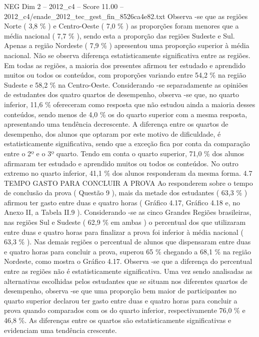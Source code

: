 \begin{textsample}{NEG Dim 2 – 2012\_c4 – Score 11.00 – 2012\_c4/enade\_2012\_tec\_gest\_fin\_8526ca4e82.txt}
Observa -se que as regiões Norte ( 3,8 \% ) e Centro-Oeste ( 7,0 \% ) as proporções foram menores que a média nacional ( 7,7 \% ), sendo esta a proporção das regiões Sudeste e Sul.
Apenas a região Nordeste ( 7,9 \% ) apresentou uma proporção superior à média nacional.
Não se observa diferença estatisticamente significativa entre as regiões.
Em todas as regiões, a maioria dos presentes afirmou ter estudado e aprendido muitos ou todos os conteúdos, com proporções variando entre 54,2 \% na região Sudeste e 58,2 \% na Centro-Oeste.
Considerando -se separadamente as opiniões de estudantes dos quatro quartos de desempenho, observa -se que, no quarto inferior, 11,6 \% ofereceram como resposta que não estudou ainda a maioria desses conteúdos, sendo menos de 4,0 \% os do quarto superior com a mesma resposta, apresentando uma tendência decrescente.
A diferença entre os quartos de desempenho, dos alunos que optaram por este motivo de dificuldade, é estatisticamente significativa, sendo que a exceção fica por conta da comparação entre o 2º e o 3º quarto.
Tendo em conta o quarto superior, 71,0 \% dos alunos afirmaram ter estudado e aprendido muitos ou todos os conteúdos.
No outro extremo no quarto inferior, 41,1 \% dos alunos responderam da mesma forma. 4.7 TEMPO GASTO PARA CONCLUIR A PROVA Ao responderem sobre o tempo de conclusão da prova ( Questão 9 ), mais da metade dos estudantes ( 63,3 \% ) afirmou ter gasto entre duas e quatro horas ( Gráfico 4.17, Gráfico 4.18 e, no Anexo II, a Tabela II.9 ).
Considerando -se as cinco Grandes Regiões brasileiras, nas regiões Sul e Sudeste ( 62,9 \% em ambas ) o percentual dos que utilizaram entre duas e quatro horas para finalizar a prova foi inferior à média nacional ( 63,3 \% ).
Nas demais regiões o percentual de alunos que dispensaram entre duas e quatro horas para concluir a prova, superou 65 \% chegando a 68,1 \% na região Nordeste, como mostra o Gráfico 4.17.
Observa -se que a diferença do percentual entre as regiões não é estatisticamente significativa.
Uma vez sendo analisadas as alternativas escolhidas pelos estudantes que se situam nos diferentes quartos de desempenho, observa -se que uma proporção bem maior de participantes no quarto superior declarou ter gasto entre duas e quatro horas para concluir a prova quando comparados com os do quarto inferior, respectivamente 76,0 \% e 46,8 \%.
As diferenças entre os quartos são estatisticamente significativas e evidenciam uma tendência crescente.

\end{textsample}

